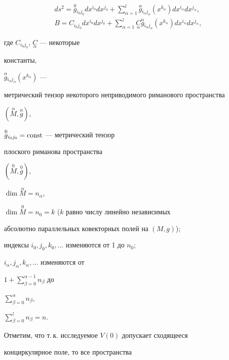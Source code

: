 \begin{gather}


ds^2=\overset{0} g{}_{i_{0}j_{0}} dx^{i_0}dx^{j_0}+


\sum_{\alpha=1}^l \overset {\alpha}{g}{}_{i_{\alpha}j_{\alpha}}


(x^{k_{\alpha}}) dx^{i_{\alpha}}dx^{j_{\alpha}}, \\


%


B = C_{i_{0}j_{0}} dx^{i_0}dx^{j_0}+\sum_{\alpha=1}^l


\underset {\alpha}{C}{} \overset {\alpha}{g}{}_{i_{\alpha}j_{\alpha}}


(x^{k_{\alpha}}) dx^{i_{\alpha}}dx^{j_{\alpha}},


\end{gather}


где $C_{i_{0}j_{0}}$, $\underset {\alpha}{C}$ --- некоторые 


константы,


$\overset {\alpha}{g}{}_{i_{\alpha}j_{\alpha}}(x^{k_{\alpha}})$ --- 


метрический тензор некоторого неприводимого риманового пространства


$(\overset {\alpha}{M},\overset {\alpha}{g})$,


$\overset{0}{g}{}_{i_{0}j_{0}}= \operatorname{const}$ --- метрический тензор 


плоского риманова пространства


$(\overset{0}{M}{},\overset{0}{g}{})$,


$\dim \overset {\alpha}{M}{} = n_{\alpha}$,


$\dim \overset{0}{M}{} = n_0 = k$ ($k$ равно числу линейно независимых 


абсолютно параллельных ковекторных полей на $(M, g)$); 


индексы $i_0,j_0, k_0,\dotsc$ изменяются от 1 до $n_0$;


$i_{\alpha},j_{\alpha},k_{\alpha},\dotsc$ изменяются от


$1+ \sum\limits_{\beta =0}^{\alpha -1} n_{\beta}$ до


$\sum\limits_{\beta =0}^{\alpha } n_{\beta}$,


$\sum\limits_{\beta =0}^{l } n_{\beta}=n $.





Отметим, что т.\,к. исследуемое $V(0)$ допускает сходящееся 


конциркулярное поле, то все пространства



